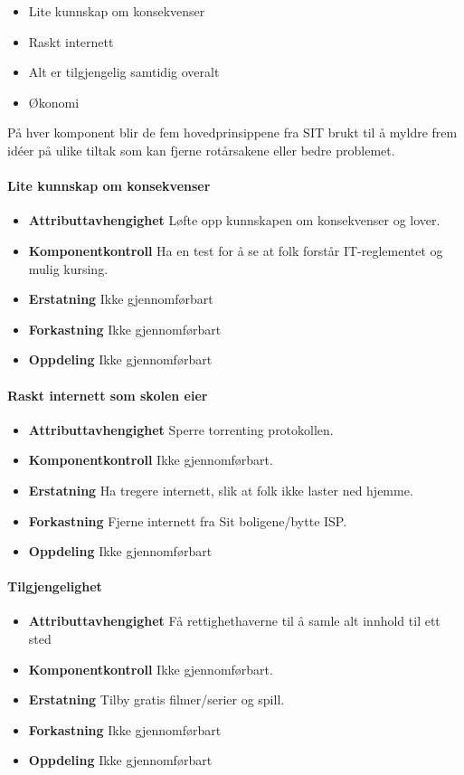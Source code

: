 \begin{itemize}
    \item Lite kunnskap om konsekvenser
    \item Raskt internett
    \item Alt er tilgjengelig samtidig overalt
    \item Økonomi
\end{itemize}

På hver komponent blir de fem hovedprinsippene fra SIT brukt til å myldre frem idéer på ulike tiltak som kan fjerne rotårsakene eller bedre problemet.

\paragraph{Lite kunnskap om konsekvenser}
\begin{itemize}
    \item \textbf{Attributtavhengighet} Løfte opp kunnskapen om konsekvenser og lover.
    \item \textbf{Komponentkontroll} Ha en test for å se at folk forstår IT-reglementet og mulig kursing.
    \item \textbf{Erstatning} Ikke gjennomførbart
    \item \textbf{Forkastning} Ikke gjennomførbart
    \item \textbf{Oppdeling} Ikke gjennomførbart
\end{itemize}

\paragraph{Raskt internett som skolen eier}
\begin{itemize}
    \item \textbf{Attributtavhengighet} Sperre torrenting protokollen.
    \item \textbf{Komponentkontroll} Ikke gjennomførbart.
    \item \textbf{Erstatning} Ha tregere internett, slik at folk ikke laster ned hjemme.
    \item \textbf{Forkastning} Fjerne internett fra Sit boligene/bytte ISP.
    \item \textbf{Oppdeling} Ikke gjennomførbart
\end{itemize}

\paragraph{Tilgjengelighet}
\begin{itemize}
    \item \textbf{Attributtavhengighet} Få rettighethaverne til å samle alt innhold til ett sted 
    \item \textbf{Komponentkontroll} Ikke gjennomførbart.
    \item \textbf{Erstatning} Tilby gratis filmer/serier og spill.
    \item \textbf{Forkastning} Ikke gjennomførbart
    \item \textbf{Oppdeling} Ikke gjennomførbart
\end{itemize}

